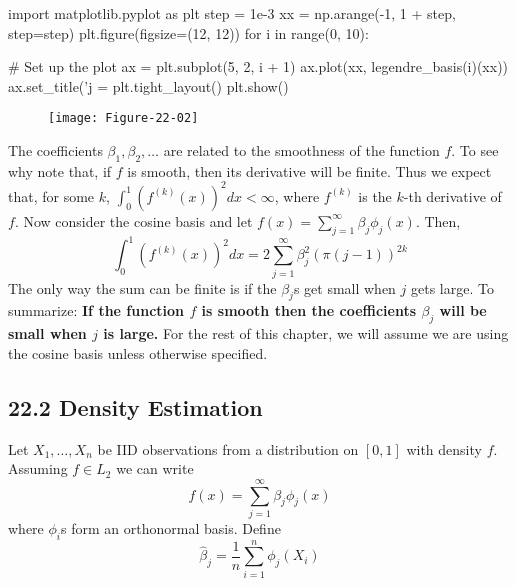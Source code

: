 \begin{python}
import matplotlib.pyplot as plt
step = 1e-3
xx = np.arange(-1, 1 + step, step=step)
plt.figure(figsize=(12, 12))
for i in range(0, 10):
    
    # Set up the plot
    ax = plt.subplot(5, 2, i + 1)
    ax.plot(xx, legendre_basis(i)(xx))
    ax.set_title('j = %
plt.tight_layout()
plt.show()
\end{python}

\begin{figure}[H]
\centering
\texttt{[image: Figure-22-02]}
\end{figure}

The coefficients \(\beta_{1}, \beta_{2}, \dots\) are related to the
smoothness of the function \(f\). To see why note that, if \(f\) is
smooth, then its derivative will be finite. Thus we expect that, for
some \(k\), \(\int_{0}^{1} (f^{(k)}(x))^{2} dx < \infty\), where \(f^{(k)}\)
is the \(k\)-th derivative of \(f\).
Now consider the cosine basis and let
\(f(x) = \sum_{j=1}^{\infty} \beta_{j} \phi_{j}(x)\). Then,
\[
\int_{0}^{1} (f^{(k)}(x))^{2} dx = 2 \sum_{j=1}^{\infty} \beta_{j}^{2} ( \pi (j - 1) ) ^{2k}
\]
The only way the sum can be finite is if the \(\beta_{j}\)s get small
when \(j\) gets large. To summarize:
\textbf{If the function \(f\) is smooth then the coefficients
\(\beta_{j}\) will be small when \(j\) is large.}
For the rest of this chapter, we will assume we are using the cosine
basis unless otherwise specified.

\subsection*{22.2 Density Estimation}\label{density-estimation}
Let \(X_{1}, \dots, X_{n}\) be IID observations from a distribution on
\([0, 1]\) with density \(f\). Assuming \(f \in L_{2}\) we can write
\[
f(x) = \sum_{j=1}^{\infty} \beta_{j} \phi_{j}(x)
\]
where \(\phi_{i}\)s form an orthonormal basis. Define
\[
\hat{\beta}_{j} = \frac{1}{n} \sum_{i=1}^{n} \phi_{j}(X_{i})
\]

